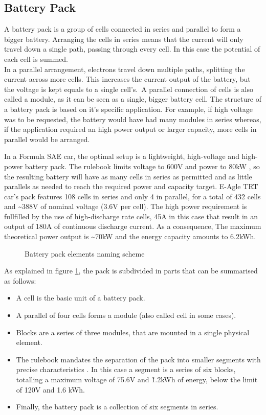 \subsection{Battery Pack}
A battery pack is a group of cells connected in series and parallel to form a bigger battery. Arranging the cells in series means that the current will only travel down a single path, passing through every cell. In this case the potential of each cell is summed. \\
In a parallel arrangement, electrons travel down multiple paths, splitting the current across more cells. This increases the current output of the battery, but the voltage is kept equals to a single cell's.\ A parallel connection of cells is also called a module, as it can be seen as a single, bigger battery cell.
The structure of a battery pack is based on it's specific application. For example, if high voltage was to be requested, the battery would have had many modules in series whereas, if the application required an high power output or larger capacity, more cells in parallel would be arranged.

In a Formula SAE car, the optimal setup is a lightweight, high-voltage and high-power battery pack. The rulebook limits voltage to 600V \cite[EV 4.1.1]{fsg2020} and power to 80kW \cite[EV 2.2.1]{fsg2020}, so the resulting battery will have as many cells in series as permitted and as little parallels as needed to reach the required power and capacity target. E-Agle TRT car's pack features 108 cells in series and only 4 in parallel, for a total of 432 cells and \~{}388V of nominal voltage (3.6V per cell). The high power requirement is fullfilled by the use of high-discharge rate cells, 45A in this case that result in an output  of 180A of continuous discharge current. As a consequence, The maximum theoretical power output is \~{}70kW and the energy capacity amounts to 6.2kWh.

\begin{figure}[h]
    \centering
    
    \caption{Battery pack elements naming scheme}
    \label{fig:naming}
\end{figure}
As explained in figure \ref{fig:naming}, the pack is subdivided in parts that can be summarised as follows:
\begin{itemize}
    \item A cell is the basic unit of a battery pack.
    \item A parallel of four cells forms a module (also called cell in some cases).
    \item Blocks are a series of three modules, that are mounted in a single physical element.
    \item The rulebook mandates the separation of the pack into smaller segments with precise characteristics \cite[EV 5.3.2]{fsg2020}. In this case a segment is a series of six blocks, totalling a maximum voltage of 75.6V and \~1.2kWh of energy, below the limit of 120V and 1.6 kWh.
    \item Finally, the battery pack is a collection of six segments in series.
\end{itemize}

